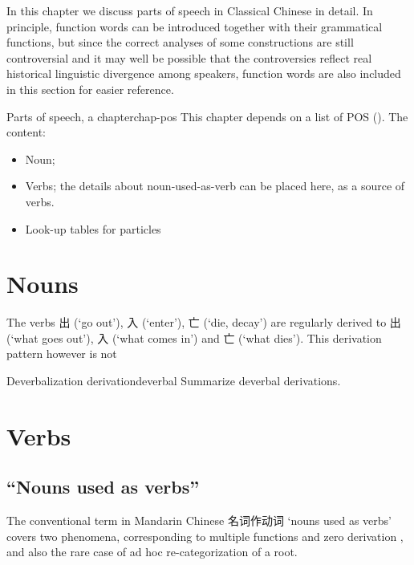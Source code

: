 \documentclass[UTF8, a4paper, oneside, scheme=plain, 12pt]{ctexrep}
\newcommand*{\citesec}[1]{\S~{#1}}
\newcommand{\translate}[1]{`#1'}
\begin{document}
In this chapter we discuss parts of speech in Classical Chinese in detail.
In principle, function words can be introduced together with their grammatical functions,
but since the correct analyses of some constructions are still controversial
and it may well be possible that the controversies reflect
real historical linguistic divergence among speakers,
function words are also included in this section for easier reference.

\begin{todobox}{Parts of speech, a chapter}{chap-pos}
    This chapter depends on a list of POS ().
    The content:
    \begin{itemize}
        \item Noun; 
        \item Verbs; the details about noun-used-as-verb can be placed here, as a source of verbs.
        \item Look-up tables for particles
    \end{itemize}
\end{todobox}

\section{Nouns}


The verbs 出 (\translate{go out}), 入 (\translate{enter}), 亡 (\translate{die, decay})
are regularly derived to 出 (\translate{what goes out}), 入 (\translate{what comes in})
and 亡 (\translate{what dies}).
This derivation pattern however is not 

\begin{todobox}{Deverbalization derivation}{deverbal}
    Summarize deverbal derivations.  
\end{todobox}

\section{Verbs}

\subsection{``Nouns used as verbs''}\label{sec:pos.verb.noun-to-verb}

The conventional term in Mandarin Chinese 名词作动词 \translate{nouns used as verbs} covers two phenomena,
corresponding to multiple functions and zero derivation \citep[\citesec{11.3}]{dixon2010basic2},
and also the rare case of ad hoc re-categorization of a root.
\end{document}
